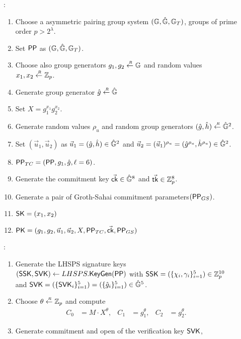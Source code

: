  \begin{description}
   	 \item[]:
      \begin{enumerate}
      \item Choose a asymmetric pairing group system $(\mathbb{G}, \hat{\mathbb{G}}, \mathbb{G}_T)$, groups of prime order $p > 2^\lambda$.
      \item Set $\mathsf{PP}$ as $(\mathbb{G}, \hat{\mathbb{G}}, \mathbb{G}_T)$.
      \item Choose also group generators $g_1, g_2 \stackrel{{\scriptscriptstyle \mkern4mu R}}{\gets} \mathbb{G}$ and random values $x_1, x_2 \stackrel{{\scriptscriptstyle \mkern4mu R}}{\gets} \mathbb{Z}_p$.
      \item Generate group generator $\hat{g} \stackrel{{\scriptscriptstyle \mkern4mu R}}{\gets} \hat{\mathbb{G}}$
      \item Set $X = g_1^{x_1}g_2^{x_2}$.
      \item Generate random values $\rho_u$ and random group generators $(\hat{g}, \hat{h}) \stackrel{{\scriptscriptstyle \mkern4mu R}}{\gets} \hat{\mathbb{G}}^2$.
      \item Set $(\vec{u}_1, \vec{u}_2)$ as $\vec{u}_1 = (\hat{g}, \hat{h}) \in \hat{\mathbb{G}}^2$ and $\vec{u}_2 = (\vec{u}_1)^{\rho_u} = (\hat{g}^{\rho_u}, \hat{h}^{\rho_u}) \in \hat{\mathbb{G}}^2$.
      \item $\mathsf{PP}_{TC} = (\mathsf{PP}, g_1, \hat{g}, \ell = 6)$.
      \item Generate the commitment key $\vec{\mathsf{ck}} \in \hat{\mathbb{G}}^8$ and $\vec{\mathsf{tk}} \in \mathbb{Z}_p^8$.
      \item Generate a pair of Groth-Sahai commitment parameters$(\mathsf{PP}_{GS})$.
      \item $\mathsf{SK} = (x_1, x_2)$
      \item $\mathsf{PK} = (g_1, g_2, \vec{u}_1, \vec{u}_2, X, \mathsf{PP}_{TC}, \vec{\mathsf{ck}}, \mathsf{PP}_{GS})$
      \end{enumerate}
    \item[]:
      \begin{enumerate}
      \item Generate the LHSPS signature keys $(\mathsf{SSK}, \mathsf{SVK}) \gets LHSPS.{\mathsf{KeyGen}}(\mathsf{PP})$ with $\mathsf{SSK} = (\{\chi_i, \gamma_i\}_{i=1}^5) \in \mathbb{Z}_p^{10}$ and $\mathsf{SVK} = (\{\mathsf{SVK}_i\}_{i=1}^5) = (\{\hat{g}_i\}_{i =1}^5) \in \hat{\mathbb{G}}^5$.
      \item Choose $\theta \stackrel{{\scriptscriptstyle \mkern4mu R}}{\gets} \mathbb{Z}_p$ and compute
        \begin{align*}
          C_0 &= M\cdot X^{\theta}, & C_1 &= g_1^{\theta}, & C_2 &= g_2^{\theta}.
        \end{align*}
      \item Generate commitment and open of the verification key $\mathsf{SVK}$, 

\end{enumerate}
\end{description}
